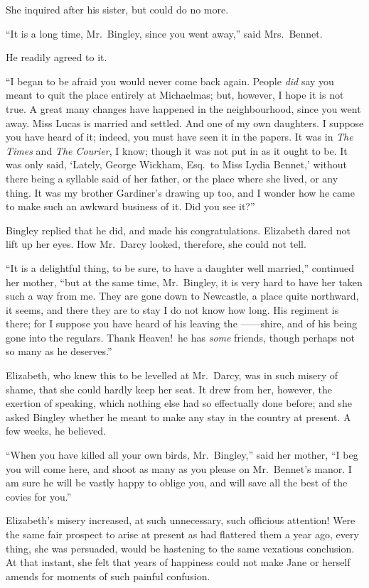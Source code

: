 \documentclass[12pt,english]{book}
\begin{document}
She inquired after his sister, but could do no more.

{}``It is a long time, Mr.\ Bingley, since you went away,'' said
Mrs.\ Bennet.

He readily agreed to it.

{}``I began to be afraid you would never come back again. People
\textit{did} say you meant to quit the place entirely at Michaelmas;
but, however, I hope it is not true. A great many changes have happened
in the neighbourhood, since you went away. Miss Lucas is married and
settled. And one of my own daughters. I suppose you have heard of
it; indeed, you must have seen it in the papers. It was in \emph{The
Times} and \emph{The Courier}, I know; though it was not put in as
it ought to be. It was only said, `Lately, George Wickham, Esq.\ to
Miss Lydia Bennet,' without there being a syllable said of her father,
or the place where she lived, or any thing. It was my brother Gardiner's
drawing up too, and I wonder how he came to make such an awkward business
of it. Did you see it?''\ 

Bingley replied that he did, and made his congratulations. Elizabeth
dared not lift up her eyes. How Mr.\ Darcy looked, therefore, she
could not tell.

{}``It is a delightful thing, to be sure, to have a daughter well
married,'' continued her mother, {}``but at the same time, Mr.\ Bingley,
it is very hard to have her taken such a way from me. They are gone
down to Newcastle, a place quite northward, it seems, and there they
are to stay I do not know how long. His regiment is there; for I suppose
you have heard of his leaving the \mbox{------}shire, and of his
being gone into the regulars. Thank Heaven!\ he has \textit{some}
friends, though perhaps not so many as he deserves.''

Elizabeth, who knew this to be levelled at Mr.\ Darcy, was in such
misery of shame, that she could hardly keep her seat. It drew from
her, however, the exertion of speaking, which nothing else had so
effectually done before; and she asked Bingley whether he meant to
make any stay in the country at present. A few weeks, he believed.

{}``When you have killed all your own birds, Mr.\ Bingley,'' said
her mother, {}``I beg you will come here, and shoot as many as you
please on Mr.\ Bennet's manor. I am sure he will be vastly happy
to oblige you, and will save all the best of the covies for you.''

Elizabeth's misery increased, at such unnecessary, such officious
attention! Were the same fair prospect to arise at present as had
flattered them a year ago, every thing, she was persuaded, would be
hastening to the same vexatious conclusion. At that instant, she felt
that years of happiness could not make Jane or herself amends for
moments of such painful confusion.
\end{document}
